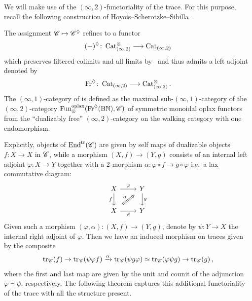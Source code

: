 We will make use of the $(\infty,2)$-functoriality of the trace.
For this purpose, recall the following construction of 
Hoyois--Scherotzke--Sibilla~\cite{Hoyois_Scherotzke_Sibilla2017}.

\begin{cons}
The assignment $\mathscr{C}\mapsto \mathscr{C}^{\lozenge}$ refines to a functor
\[ (-)^{\lozenge}\colon \operatorname{Cat}^{\otimes}_{(\infty,2)} \longrightarrow \operatorname{Cat}_{(\infty,2)}\]
which preserves filtered colimits and all limits by~\cite[Proposition 4.6.1.11]{Lurie2017}
and thus admits a left adjoint denoted by
\[ \mathrm{Fr}^{\lozenge}\colon \operatorname{Cat}_{(\infty,2)} \longrightarrow \operatorname{Cat}^{\otimes}_{(\infty,2)}.\]
The $(\infty,1)$-category of  is defined as the
maximal sub-$(\infty,1)$-category \mdef{$\Endtrl(\cC)$} of the $(\infty,2)$-category 
$\operatorname{Fun}^{\mathrm{oplax}}_{\otimes}(\mathrm{Fr}^{\lozenge}(\mathrm{B}\mathbb{N}), \mathscr{C})$
of symmetric monoidal oplax functors from the ``dualizably free'' $(\infty,2)$-category
on the walking category with one endomorphism.
\end{cons}

Explicitly, objects of $\Endtrl(\cC)$ are given by self
maps of dualizable objects $f\colon X \to X$ in $\mathscr{C}$, while a morphism $(X,f) \to (Y,g)$
consists of an internal left adjoint $\varphi\colon X \to Y$ together with a 2-morphism
$\alpha \colon \varphi \circ f \to g \circ \varphi $ i.e.~a lax commutative diagram:
\[\begin{tikzcd}
    X & Y \\
    X & Y
    \arrow["\varphi", from=1-1, to=1-2] \arrow["f"', from=1-1, to=2-1] \arrow["g", from=1-2, to=2-2] \arrow["\alpha", shorten <=4pt, shorten >=4pt, Rightarrow, from=2-1, to=1-2] \arrow["\varphi"', from=2-1, to=2-2]
\end{tikzcd}\]
Given such a morphism $(\varphi,\alpha)\colon (X,f)\to (Y,g)$, denote by $\psi \colon Y\to X$ 
the internal right adjoint of $\varphi$. Then we have an induced morphism on traces given
by the composite
\[ \mathrm{tr}_{\mathscr{C}} (f) \to \mathrm{tr}_{\mathscr{C}} (\psi \varphi f) \xrightarrow{\alpha} \mathrm{tr}_{\mathscr{C}} (\psi g \varphi)
\simeq \mathrm{tr}_{\mathscr{C}} (\varphi \psi g) \to \mathrm{tr}_{\mathscr{C}} (g)\,,\]
where the first and last map are given by the unit and counit of the adjunction
$\varphi \dashv \psi$, respectively. The following theorem captures this additional
functoriality of the trace with all the structure present.


